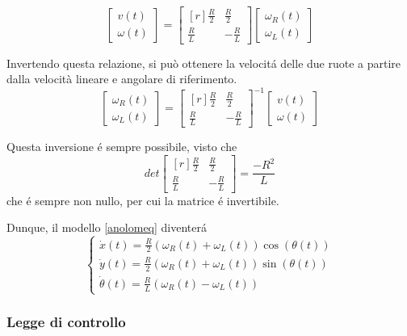\documentclass[14pt,a4paper]{extarticle}
\begin{document}
\begin{equation}
\begin{bmatrix}
v(t) \\
\omega(t)
\end{bmatrix}
=
\begin{bmatrix*}[r]
\frac{R}{2} & \frac{R}{2} \\
\frac{R}{L} & -\frac{R}{L}
\end{bmatrix*}
\begin{bmatrix}
\omega_R(t) \\
\omega_L(t)
\end{bmatrix}
\end{equation} 

Invertendo questa relazione, si può ottenere la velocitá delle due ruote a partire dalla velocità lineare e angolare di riferimento.
\begin{equation}
\label{wrwl}
\begin{bmatrix}
\omega_R(t) \\
\omega_L(t)
\end{bmatrix}
=
\begin{bmatrix*}[r]
\frac{R}{2} & \frac{R}{2} \\
\frac{R}{L} & -\frac{R}{L}
\end{bmatrix*}^{-1}
\begin{bmatrix}
v(t) \\
\omega(t)
\end{bmatrix}
\end{equation}

Questa inversione é sempre possibile, visto che
\[det\begin{bmatrix*}[r]
\frac{R}{2} & \frac{R}{2} \\
\frac{R}{L} & -\frac{R}{L}
\end{bmatrix*} = \frac{-R^2}{L}\] che é sempre non nullo, per cui la matrice é invertibile.

Dunque, il modello \ref{anolomeq} diventerá
\begin{equation}
\label{DDeq}
\begin{cases}
\dot{x}(t) = \frac{R}{2} \left( \omega_R(t)+\omega_L(t) \right) \cos(\theta(t)) \\
\dot{y}(t) = \frac{R}{2} \left( \omega_R(t)+\omega_L(t) \right)\sin(\theta(t)) \\
\dot{\theta}(t) = \frac{R}{L} \left( \omega_R(t)-\omega_L(t) \right)
\end{cases}
\end{equation} 

\subsubsection{Legge di controllo \cite{dalfonso}}
\end{document}
